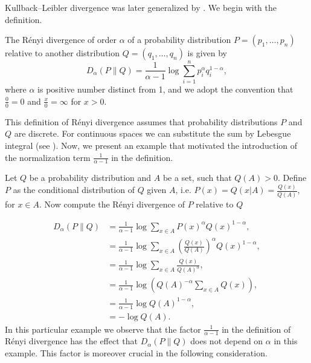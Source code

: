 Kullback–Leibler divergence was later generalized by \cite{Rényi1961}. We begin with the definition.

\begin{defn}
	The Rényi divergence of order $\alpha$ of a probability distribution $P = (p_1,\ldots,p_n)$ relative to another distribution $Q = (q_1,\ldots,q_n)$ is given by
	\begin{equation*}
		D_\alpha(P \| Q) = \frac{1}{\alpha-1} \log \sum_{i=1}^{n} p_i^\alpha q_i^{1-\alpha},
	\end{equation*}
	where $\alpha$ is positive number distinct from 1, and we adopt the convention that $\frac{0}{0} = 0$ and $\frac{x}{0} = \infty$ for $x>0$.
	\label{Rényi Divergence}
\end{defn}

This definition of Rényi divergence assumes that probability distributions $P$ and $Q$ are discrete. For continuous spaces we can substitute the sum by Lebesgue integral (see \cite{vanErvenHarremoës2012}). Now, we present an example that motivated the introduction of the normalization term $\frac{1}{\alpha-1}$ in the definition.

\begin{example}
	Let $Q$ be a probability distribution and $A$ be a set, such that $Q(A)>0$. Define $P$ as the conditional distribution of $Q$ given $A$, i.e. $P(x) = Q(x|A) = \frac{Q(x)}{Q(A)}$, for $x \in A$. Now compute the Rényi divergence of $P$ relative to $Q$
	
	\begin{align*}
		D_\alpha(P \| Q) &= \frac{1}{\alpha-1} \log \sum_{x\in A} P(x)^\alpha Q(x)^{1-\alpha}, \\
		&= \frac{1}{\alpha-1} \log \sum_{x\in A} \left(\frac{Q(x)}{Q(A)}\right)^\alpha Q(x)^{1-\alpha}, \\
		&= \frac{1}{\alpha-1} \log \sum_{x\in A} \frac{Q(x)}{Q(A)^\alpha}, \\
		&= \frac{1}{\alpha-1} \log \left( Q(A)^{-\alpha} \sum_{x\in A} Q(x) \right), \\
		&= \frac{1}{\alpha-1} \log Q(A)^{1-\alpha}, \\
		&= - \log Q(A).
	\end{align*}
	In this particular example we observe that the factor $\frac{1}{\alpha-1}$ in the definition of Rényi divergence has the effect that $D_\alpha(P \| Q)$ does not depend on $\alpha$ in this example. This factor is moreover crucial in the following consideration.
\end{example}

